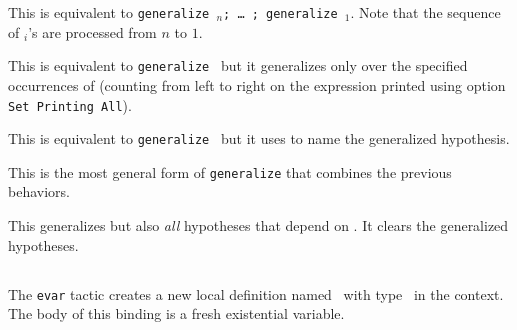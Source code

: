 \begin{Variants}
\item {}

  This is equivalent to {\tt generalize \term$_n$; \dots\ ; generalize
    \term$_1$}. Note that the sequence of \term$_i$'s are processed
  from $n$ to $1$.

\item {}

  This is equivalent to {\tt generalize \term} but it generalizes only over
  the specified occurrences of {\term} (counting from left to right on the
  expression printed using option {\tt Set Printing All}).

\item {}

  This is equivalent to {\tt generalize \term} but it uses {\ident} to name the
  generalized hypothesis.

\item {}

  This is the most general form of {\tt generalize} that combines the
  previous behaviors.

\item {} 

  This generalizes {\term} but also {\em all} hypotheses that depend
  on {\term}. It clears the generalized hypotheses.

\end{Variants}

\subsection{}
\label{evar}

The {\tt evar} tactic creates a new local definition named \ident\ with
type \term\ in the context. The body of this binding is a fresh
existential variable.

\subsection{}
\label{instantiate}

